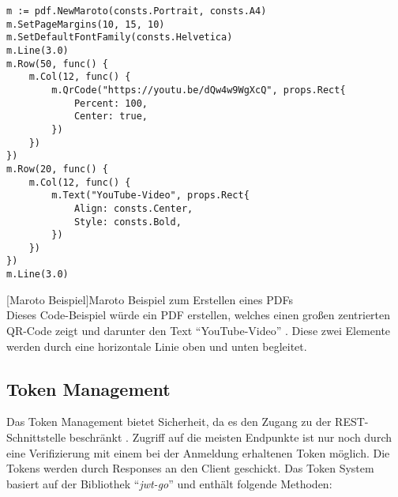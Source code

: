 \begin{verbatim}
m := pdf.NewMaroto(consts.Portrait, consts.A4)
m.SetPageMargins(10, 15, 10)
m.SetDefaultFontFamily(consts.Helvetica)
m.Line(3.0)
m.Row(50, func() {
	m.Col(12, func() {
		m.QrCode("https://youtu.be/dQw4w9WgXcQ", props.Rect{
			Percent: 100,
			Center: true,
		})
	})
})
m.Row(20, func() {
	m.Col(12, func() {
		m.Text("YouTube-Video", props.Rect{
			Align: consts.Center,
			Style: consts.Bold,
		})
	})
})
m.Line(3.0)
\end{verbatim}
[Maroto Beispiel]{Maroto Beispiel zum Erstellen eines PDFs \cite{marotoart}}
~\\
Dieses Code-Beispiel würde ein PDF erstellen, welches einen großen zentrierten QR-Code zeigt und darunter den Text \enquote{YouTube-Video} \cite{maroto}. Diese zwei Elemente werden durch eine horizontale Linie oben und unten begleitet.

\newpage
\subsection{Token Management}

Das Token Management bietet Sicherheit, da es den Zugang zu der REST-Schnittstelle beschränkt \cite{jwt-go} \cite{tokenmanager}. Zugriff auf die meisten Endpunkte ist nur noch durch eine Verifizierung mit einem bei der Anmeldung erhaltenen Token möglich. Die Tokens werden durch Responses an den Client geschickt. Das Token System basiert auf der Bibliothek \enquote{\textit{jwt-go}} und enthält folgende Methoden:

